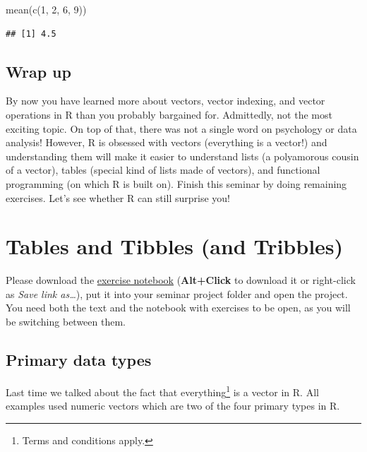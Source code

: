 \documentclass[
]{book}
\newenvironment{Shaded}{\begin{snugshade}}{\end{snugshade}}
\newcommand{\DecValTok}[1]{\textcolor[rgb]{0.00,0.00,0.81}{#1}}
\newcommand{\FunctionTok}[1]{\textcolor[rgb]{0.00,0.00,0.00}{#1}}
\newcommand{\NormalTok}[1]{#1}
\begin{document}
\begin{Shaded}
\begin{Highlighting}[]
\FunctionTok{mean}\NormalTok{(}\FunctionTok{c}\NormalTok{(}\DecValTok{1}\NormalTok{, }\DecValTok{2}\NormalTok{, }\DecValTok{6}\NormalTok{, }\DecValTok{9}\NormalTok{))}
\end{Highlighting}
\end{Shaded}

\begin{verbatim}
## [1] 4.5
\end{verbatim}

\hypertarget{wrap-up}{%
\section{Wrap up}\label{wrap-up}}

By now you have learned more about vectors, vector indexing, and vector operations in R than you probably bargained for. Admittedly, not the most exciting topic. On top of that, there was not a single word on psychology or data analysis! However, R is obsessed with vectors (everything is a vector!) and understanding them will make it easier to understand lists (a polyamorous cousin of a vector), tables (special kind of lists made of vectors), and functional programming (on which R is built on). Finish this seminar by doing remaining exercises. Let's see whether R can still surprise you!

\hypertarget{tables}{%
\chapter{Tables and Tibbles (and Tribbles)}\label{tables}}

Please download the \href{notebooks/Seminar\%2003\%20-\%20Tables.Rmd}{exercise notebook} (\textbf{Alt+Click} to download it or right-click as \emph{Save link as\ldots{}}), put it into your seminar project folder and open the project. You need both the text and the notebook with exercises to be open, as you will be switching between them.

\hypertarget{primary-types}{%
\section{Primary data types}\label{primary-types}}

Last time we talked about the fact that everything\footnote{Terms and conditions apply.} is a vector in R. All examples used numeric vectors which are two of the four primary types in R.
\end{document}
